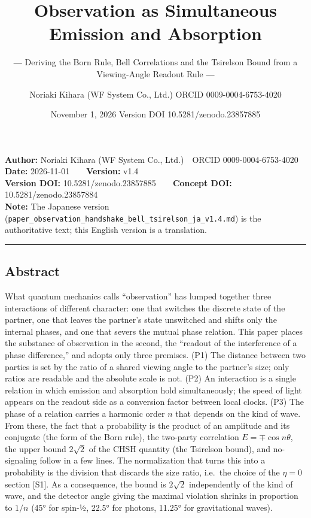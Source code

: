 \documentclass[
  a4paper,
]{article}
\title{Observation as Simultaneous Emission and Absorption}
\subtitle{― Deriving the Born Rule, Bell Correlations and the Tsirelson
Bound from a Viewing-Angle Readout Rule ―}
\author{Noriaki Kihara (WF System Co., Ltd.) ORCID 0009-0004-6753-4020}
\date{November 1, 2026 Version DOI 10.5281/zenodo.23857885}
\begin{document}
\maketitle

\textbf{Author:} Noriaki Kihara (WF System Co., Ltd.)　ORCID
0009-0004-6753-4020\\
\textbf{Date:} 2026-11-01　　\textbf{Version:} v1.4\\
\textbf{Version DOI:} 10.5281/zenodo.23857885　　\textbf{Concept DOI:}
10.5281/zenodo.23857884\\
\textbf{Note:} The Japanese version
(\texttt{paper\_\allowbreak{}observation\_\allowbreak{}handshake\_\allowbreak{}bell\_\allowbreak{}tsirelson\_\allowbreak{}ja\_\allowbreak{}v1.4.md})
is the authoritative text; this English version is a translation.

\begin{center}\rule{0.5\linewidth}{0.5pt}\end{center}

\subsection{Abstract}\label{abstract}

What quantum mechanics calls ``observation'' has lumped together three
interactions of different character: one that switches the discrete
state of the partner, one that leaves the partner's state unswitched and
shifts only the internal phases, and one that severs the mutual phase
relation. This paper places the substance of observation in the second,
the ``readout of the interference of a phase difference,'' and adopts
only three premises. (P1) The distance between two parties is set by the
ratio of a shared viewing angle to the partner's size; only ratios are
readable and the absolute scale is not. (P2) An interaction is a single
relation in which emission and absorption hold simultaneously; the speed
of light appears on the readout side as a conversion factor between
local clocks. (P3) The phase of a relation carries a harmonic order
\(n\) that depends on the kind of wave. From these, the fact that a
probability is the product of an amplitude and its conjugate (the form
of the Born rule), the two-party correlation \(E=\mp\cos n\theta\), the
upper bound \(2\sqrt{2}\) of the CHSH quantity (the Tsirelson bound),
and no-signaling follow in a few lines. The normalization that turns
this into a probability is the division that discards the size ratio,
i.e.~the choice of the \(\eta=0\) section {[}S1{]}. As a consequence,
the bound is \(2\sqrt{2}\) independently of the kind of wave, and the
detector angle giving the maximal violation shrinks in proportion to
\(1/n\) (45° for spin-½, 22.5° for photons, 11.25° for gravitational
waves).
\end{document}
